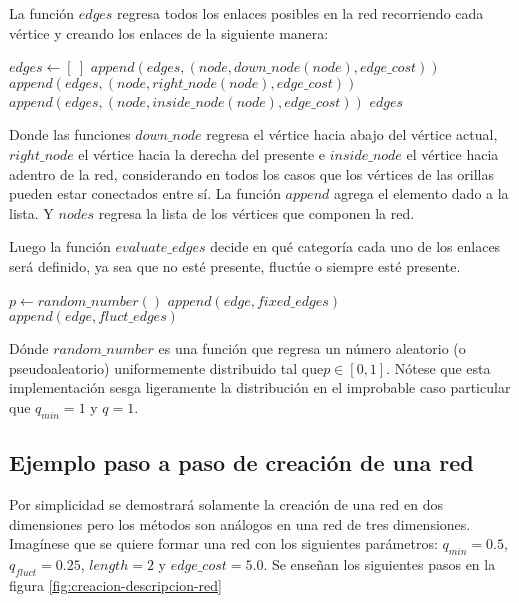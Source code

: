 La función $edges$ regresa todos los enlaces posibles en la red recorriendo cada vértice y creando los enlaces de la siguiente manera:

\begin{algorithm}
\begin{algorithmic}[1]
	\State $edges \gets [\:]$
		\State $append(edges, (node, down\_node(node), edge\_cost))$
		\State $append(edges, (node, right\_node(node), edge\_cost))$
		\State $append(edges, (node, inside\_node(node), edge\_cost))$
	\EndFor
	\State
	\Return $edges$
\EndFunction
\end{algorithmic}
\end{algorithm}

Donde las funciones $down\_node$ regresa el vértice hacia abajo del vértice actual, $right\_node$ el vértice hacia la derecha del presente e $inside\_node$ el vértice hacia adentro de la red, considerando en todos los casos que los vértices de las orillas pueden estar conectados entre sí. La función $append$ agrega el elemento dado a la lista. Y $nodes$ regresa la lista de los vértices que componen la red. 

Luego la función $evaluate\_edges$ decide en qué categoría cada uno de los enlaces será definido, ya sea que no esté presente, fluctúe o siempre esté presente.

\begin{algorithm}
\begin{algorithmic}[1]
	\State $p \gets random\_number()$
		\State $append(edge, fixed\_edges)$
		\State $append(edge,  fluct\_edges)$
	\EndIf
\EndFunction
\end{algorithmic}
\end{algorithm}

Dónde $random\_number$ es una función que regresa un número aleatorio (o pseudoaleatorio) uniformemente distribuido tal que$p \in [0,1]$. Nótese que esta implementación sesga ligeramente la distribución en el improbable caso particular que $q_{min}=1$ y $q=1$.

\subsection{Ejemplo paso a paso de creación de una red}
Por simplicidad se demostrará solamente la creación de una red en dos dimensiones pero los métodos son análogos en una red de tres dimensiones. Imagínese que se quiere formar una red con los siguientes parámetros: $q_{min}=0.5$, $q_{fluct}=0.25$, $length=2$ y $edge\_cost=5.0$. Se enseñan los siguientes pasos en la figura \ref{fig:creacion-descripcion-red}


